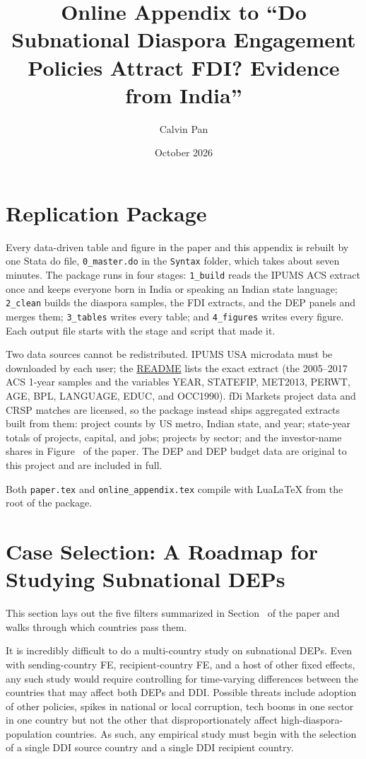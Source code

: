 \documentclass[12pt]{article}
\title{Online Appendix to ``Do Subnational Diaspora Engagement Policies Attract FDI? Evidence from India''}
\author{Calvin Pan}
\date{October 2026}
\let\oldsection\section
\renewcommand{\section}{\FloatBarrier\oldsection}
\begin{document}
\maketitle
\tableofcontents
\newpage


\section{Replication Package} \label{sec:oa_replication}

Every data-driven table and figure in the paper and this appendix is rebuilt by one Stata do file, \texttt{0\_master.do} in the \texttt{Syntax} folder, which takes about seven minutes. The package runs in four stages: \texttt{1\_build} reads the IPUMS ACS extract once and keeps everyone born in India or speaking an Indian state language; \texttt{2\_clean} builds the diaspora samples, the FDI extracts, and the DEP panels and merges them; \texttt{3\_tables} writes every table; and \texttt{4\_figures} writes every figure. Each output file starts with the stage and script that made it.

Two data sources cannot be redistributed. IPUMS USA microdata must be downloaded by each user; the \href{\repourl}{README} lists the exact extract (the 2005--2017 ACS 1-year samples and the variables YEAR, STATEFIP, MET2013, PERWT, AGE, BPL, LANGUAGE, EDUC, and OCC1990). fDi Markets project data and CRSP matches are licensed, so the package instead ships aggregated extracts built from them: project counts by US metro, Indian state, and year; state-year totals of projects, capital, and jobs; projects by sector; and the investor-name shares in Figure~ of the paper. The DEP and DEP budget data are original to this project and are included in full.

Both \texttt{paper.tex} and \texttt{online\_appendix.tex} compile with LuaLaTeX from the root of the package.


\section{Case Selection: A Roadmap for Studying Subnational DEPs} \label{sec:oa_roadmap}

This section lays out the five filters summarized in Section~ of the paper and walks through which countries pass them.

It is incredibly difficult to do a multi-country study on subnational DEPs. Even with sending-country FE, recipient-country FE, and a host of other fixed effects, any such study would require controlling for time-varying differences between the countries that may affect both DEPs and DDI. Possible threats include adoption of other policies, spikes in national or local corruption, tech booms in one sector in one country but not the other that disproportionately affect high-diaspora-population countries. As such, any empirical study must begin with the selection of a single DDI source country and a single DDI recipient country. 
\end{document}
